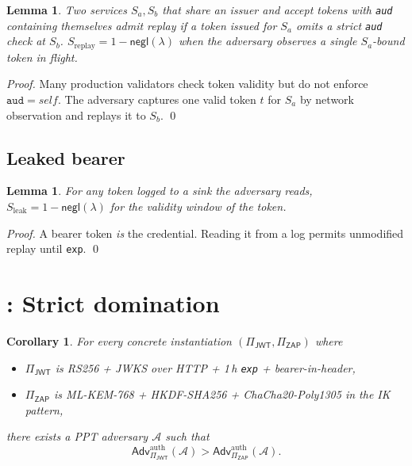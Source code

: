 \documentclass[11pt,a4paper]{article}
\theoremstyle{plain}
\newtheorem{lemma}[theorem]{Lemma}
\newtheorem{corollary}[theorem]{Corollary}
\theoremstyle{definition}
\newcommand{\Adv}{\mathsf{Adv}}
\newcommand{\JWT}{\mathsf{JWT}}
\newcommand{\ZAP}{\mathsf{ZAP}}
\newcommand{\negl}{\mathsf{negl}}
\begin{document}
\begin{lemma}
\label{lem:replay}
Two services $S_a, S_b$ that share an issuer and accept tokens with
\texttt{aud} containing themselves admit replay if a token issued for
$S_a$ omits a strict \texttt{aud} check at $S_b$.
$S_{\text{replay}} = 1 - \negl(\lambda)$ when the adversary observes a
single $S_a$-bound token in flight.
\end{lemma}

\begin{proof}
Many production validators check token validity but do not enforce
$\texttt{aud} = \mathit{self}$. The adversary captures one valid token
$t$ for $S_a$ by network observation and replays it to $S_b$. \qed
\end{proof}

\subsection{Leaked bearer}

\begin{lemma}
\label{lem:leak}
For any token logged to a sink the adversary reads,
$S_{\text{leak}} = 1 - \negl(\lambda)$ for the validity window of the
token.
\end{lemma}

\begin{proof}
A bearer token \emph{is} the credential. Reading it from a log permits
unmodified replay until \texttt{exp}. \qed
\end{proof}

\section{: Strict domination}

\begin{corollary}
\label{cor:dom}
For every concrete instantiation $(\Pi_\JWT, \Pi_\ZAP)$ where
\begin{itemize}[itemsep=2pt,topsep=2pt]
  \item $\Pi_\JWT$ is RS256 + JWKS over HTTP + 1\,h \texttt{exp} +
        bearer-in-header,
  \item $\Pi_\ZAP$ is ML-KEM-768 + HKDF-SHA256 + ChaCha20-Poly1305 in
        the IK pattern,
\end{itemize}
there exists a PPT adversary $\mathcal{A}$ such that
\[
\Adv_{\Pi_\JWT}^{\text{auth}}(\mathcal{A}) > \Adv_{\Pi_\ZAP}^{\text{auth}}(\mathcal{A}).
\]
\end{corollary}
\end{document}
